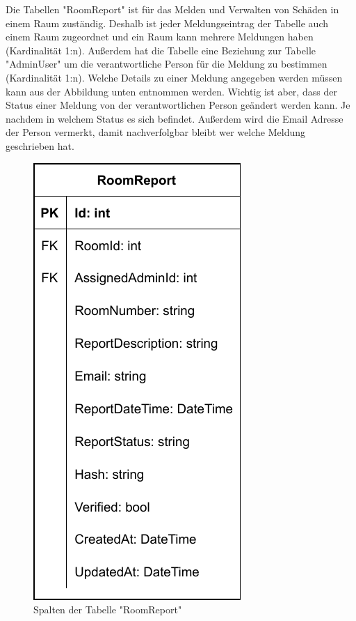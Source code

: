 
Die Tabellen "RoomReport" ist für das Melden und Verwalten von Schäden in einem Raum zuständig. Deshalb ist jeder Meldungseintrag der Tabelle auch einem Raum zugeordnet und ein Raum kann mehrere Meldungen haben (Kardinalität 1:n). Außerdem hat die Tabelle eine Beziehung zur Tabelle "AdminUser" um die verantwortliche Person für die Meldung zu bestimmen (Kardinalität 1:n). Welche Details zu einer Meldung angegeben werden müssen kann aus der Abbildung unten entnommen werden. Wichtig ist aber, dass der Status einer Meldung von der verantwortlichen Person geändert werden kann. Je nachdem in welchem Status es sich befindet. Außerdem wird die Email Adresse der Person vermerkt, damit nachverfolgbar bleibt wer welche Meldung geschrieben hat.

\begin{figure}[H]
    \centering
    \includegraphics{media/MariaDB/RoomReport.svg.pdf}
    \caption{Spalten der Tabelle "RoomReport"}
\end{figure}

